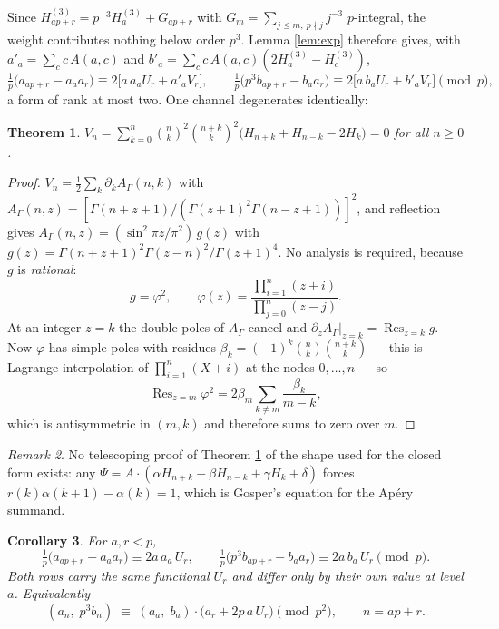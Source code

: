 \documentclass[11pt,a4paper]{amsart}
\theoremstyle{plain}
\newtheorem{theorem}{Theorem}[section]
\newtheorem{corollary}[theorem]{Corollary}
\theoremstyle{definition}
\theoremstyle{remark}
\newtheorem{remark}[theorem]{Remark}
\newcommand{\A}{A}
\DeclareMathOperator{\Res}{Res}
\begin{document}
Since $H^{(3)}_{ap+r}=p^{-3}H^{(3)}_a+G_{ap+r}$ with $G_m=\sum_{j\le m,\ p\nmid j}j^{-3}$
$p$-integral, the weight contributes nothing below order $p^3$. Lemma \ref{lem:exp}
therefore gives, with $a'_a=\sum_c c\,\A(a,c)$ and $b'_a=\sum_c c\,\A(a,c)(2H^{(3)}_a-H^{(3)}_c)$,
\[
  \tfrac1p\bigl(a_{ap+r}-a_aa_r\bigr)\equiv 2\bigl[a\,a_aU_r+a'_aV_r\bigr],
  \qquad
  \tfrac1p\bigl(p^3b_{ap+r}-b_aa_r\bigr)\equiv 2\bigl[a\,b_aU_r+b'_aV_r\bigr]
  \pmod p,
\]
a form of rank at most two. One channel degenerates identically:

\begin{theorem}\label{thm:V}
$V_n=\displaystyle\sum_{k=0}^{n}\binom nk^2\binom{n+k}k^2\bigl(H_{n+k}+H_{n-k}-2H_k\bigr)=0$
for all $n\ge0$.
\end{theorem}

\begin{proof}
$V_n=\tfrac12\sum_k\partial_k \A_\Gamma(n,k)$ with
$\A_\Gamma(n,z)=[\Gamma(n+z+1)/(\Gamma(z+1)^2\Gamma(n-z+1))]^2$, and reflection gives
$\A_\Gamma(n,z)=(\sin^2\pi z/\pi^2)\,g(z)$ with
$g(z)=\Gamma(n+z+1)^2\Gamma(z-n)^2/\Gamma(z+1)^4$. No analysis is required, because $g$ is
\emph{rational}:
\[
  g=\varphi^2,\qquad
  \varphi(z)=\frac{\prod_{i=1}^{n}(z+i)}{\prod_{j=0}^{n}(z-j)} .
\]
At an integer $z=k$ the double poles of $\A_\Gamma$ cancel and
$\partial_z \A_\Gamma|_{z=k}=\Res_{z=k}g$. Now $\varphi$ has simple poles with residues
$\beta_k=(-1)^k\binom nk\binom{n+k}k$ — this is Lagrange interpolation of
$\prod_{i=1}^n(X+i)$ at the nodes $0,\dots,n$ — so
\[
  \Res_{z=m}\varphi^2=2\beta_m\sum_{k\neq m}\frac{\beta_k}{m-k},
\]
which is antisymmetric in $(m,k)$ and therefore sums to zero over $m$.
\end{proof}

\begin{remark}
No telescoping proof of Theorem \ref{thm:V} of the shape used for the closed form exists:
any $\Psi=\A\cdot(\alpha H_{n+k}+\beta H_{n-k}+\gamma H_k+\delta)$ forces
$r(k)\alpha(k+1)-\alpha(k)=1$, which is Gosper's equation for the Ap\'ery summand.
\end{remark}

\begin{corollary}\label{cor:first}
For $a,r<p$,
\[
  \tfrac1p\bigl(a_{ap+r}-a_aa_r\bigr)\equiv 2a\,a_a\,U_r,
  \qquad
  \tfrac1p\bigl(p^3b_{ap+r}-b_aa_r\bigr)\equiv 2a\,b_a\,U_r \pmod p .
\]
Both rows carry the same functional $U_r$ and differ only by their own value at level $a$.
Equivalently
\[
  (a_n,\;p^3b_n)\;\equiv\;(a_a,\;b_a)\cdot\bigl(a_r+2p\,a\,U_r\bigr)\pmod{p^2},
  \qquad n=ap+r .
\]
\end{corollary}
\end{document}
